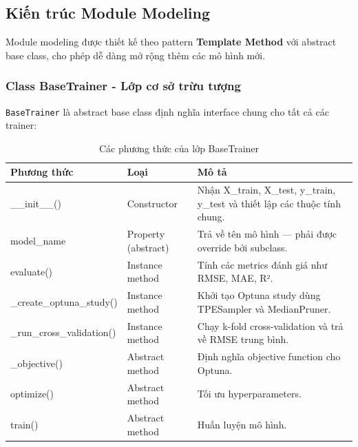 \documentclass[12pt,a4paper]{article}
\begin{document}
\subsection{Kiến trúc Module Modeling}

Module modeling được thiết kế theo pattern \textbf{Template Method} với abstract base class, cho phép dễ dàng mở rộng thêm các mô hình mới.

\subsubsection{Class BaseTrainer - Lớp cơ sở trừu tượng}

\texttt{BaseTrainer} là abstract base class định nghĩa interface chung cho tất cả các trainer:

\begin{table}[H]
\centering
\caption{Các phương thức của lớp BaseTrainer}
\label{tab:basetrainer_methods}

\renewcommand{\arraystretch}{1.25} %

{%
\setlength{\tabcolsep}{10pt} %

\begin{tabular}{|>{\ttfamily\raggedright\arraybackslash}p{5cm}  %
                |>{\raggedright\arraybackslash}p{3.2cm} 
                |>{\raggedright\arraybackslash}p{6.6cm}|} %
\hline
\textbf{Phương thức} & \textbf{Loại} & \textbf{Mô tả} \\
\hline

\_\_init\_\_() & Constructor &
Nhận X\_train, X\_test, y\_train, y\_test và thiết lập các thuộc tính chung. \\ \hline

model\_name & Property (abstract) &
Trả về tên mô hình — phải được override bởi subclass. \\ \hline

evaluate() & Instance method &
Tính các metrics đánh giá như RMSE, MAE, R². \\ \hline

\_create\_optuna\_study() & Instance method &
Khởi tạo Optuna study dùng TPESampler và MedianPruner. \\ \hline

\_run\_cross\_validation() & Instance method &
Chạy k-fold cross-validation và trả về RMSE trung bình. \\ \hline

\_objective() & Abstract method &
Định nghĩa objective function cho Optuna. \\ \hline

optimize() & Abstract method &
Tối ưu hyperparameters. \\ \hline

train() & Abstract method &
Huấn luyện mô hình. \\ \hline

\end{tabular}
}%
\end{table}
\end{document}
